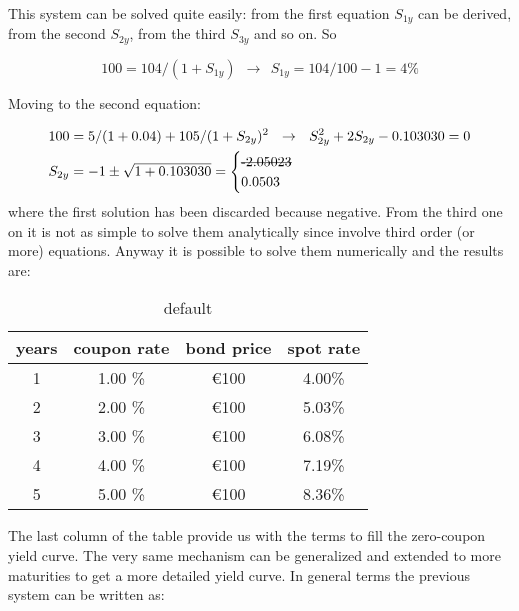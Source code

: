 This system can be solved quite easily: from the first equation $S_{1y}$ can be derived, from the second $S_{2y}$, from the third $S_{3y}$ and so on. So

\[100 = 104 / (1 + S_{1y})~~\rightarrow~~S_{1y} = 104/100 - 1 = 4\% \]

Moving to the second equation:

\begin{equation*}
\begin{split}
& 100 = 5 / (1 + 0.04) + 105 / (1 + S_{2y})^{2}~~\rightarrow~~S_{2y}^2  + 2 S_{2y}  - 0.103030 = 0 \\
& S_{2y} = - 1 \pm \sqrt{1 + 0.103030} = \begin{cases}\text{\sout{-2.05023}} \\ 0.0503\end{cases}
\end{split}
\end{equation*}
where the first solution has been discarded because negative.
From the third one on it is not as simple to solve them analytically since involve third order (or more) equations. Anyway it is possible to solve them numerically and the results are:

\begin{table}[htp]
\caption{default}
\begin{center}
\begin{tabular}{|c|c|c|c|}
\hline
\textbf{years} & \textbf{coupon rate} & \textbf{bond price} & \textbf{spot rate} \\
\hline
1 & 1.00 \% & \euro{100} & 4.00\% \\
\hline
2 & 2.00 \% & \euro{100} & 5.03\% \\
\hline
3 & 3.00 \% & \euro{100} & 6.08\% \\
\hline
4 & 4.00 \% & \euro{100} & 7.19\% \\
\hline
5 & 5.00 \% & \euro{100} & 8.36\% \\
\hline
\end{tabular}
\end{center}
\label{default}
\end{table}

The last column of the table provide us with the terms to fill the zero-coupon yield curve.
The very same mechanism can be generalized and extended to more maturities to get a more detailed yield curve. In general terms the previous system can be written as:

